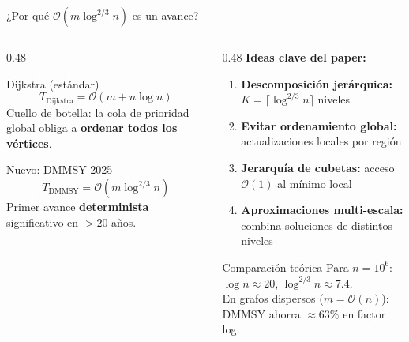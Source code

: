 \documentclass[aspectratio=169,12pt]{beamer}
\newcommand{\complejidad}[1]{\ensuremath{\mathcal{O}\!\left(#1\right)}}
\begin{document}
\begin{frame}{¿Por qué \complejidad{m\log^{2/3}n} es un avance?}
  \begin{columns}[T]
    \begin{column}{0.48\textwidth}
      \begin{block}{Dijkstra (estándar)}
        \begin{equation*}
          T_{\text{Dijkstra}} = \mathcal{O}(m + n\log n)
        \end{equation*}
        Cuello de botella: la cola de prioridad global obliga a \textbf{ordenar todos los vértices}.
      \end{block}
      \vspace{0.2cm}
      \begin{alertblock}{Nuevo: DMMSY 2025}
        \begin{equation*}
          T_{\text{DMMSY}} = \mathcal{O}(m\log^{2/3}n)
        \end{equation*}
        Primer avance \textbf{determinista} significativo en $>20$ años.
      \end{alertblock}
    \end{column}
    \begin{column}{0.48\textwidth}
      \textbf{Ideas clave del paper:}
      \begin{enumerate}\small
        \item \textbf{Descomposición jerárquica:} $K=\lceil\log^{2/3}n\rceil$ niveles
        \item \textbf{Evitar ordenamiento global:} actualizaciones locales por región
        \item \textbf{Jerarquía de cubetas:} acceso $\mathcal{O}(1)$ al mínimo local
        \item \textbf{Aproximaciones multi-escala:} combina soluciones de distintos niveles
      \end{enumerate}
      \vspace{0.2cm}
      \begin{exampleblock}{\small Comparación teórica}
        \scriptsize
        Para $n=10^6$: $\log n\approx20$, $\log^{2/3}n\approx7.4$.\\
        En grafos dispersos ($m=\mathcal{O}(n)$): DMMSY ahorra $\approx 63\%$ en factor log.
      \end{exampleblock}
    \end{column}
  \end{columns}
\end{frame}
\end{document}
